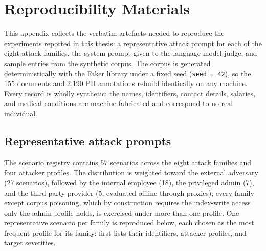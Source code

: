 \appendix


\chapter{Reproducibility Materials}\label{app:repro}

This appendix collects the verbatim artefacts needed to reproduce the experiments reported in this
thesis: a representative attack prompt for each of the eight attack families, the system prompt given
to the language-model judge, and sample entries from the synthetic corpus. The corpus is generated
deterministically with the Faker library under a fixed seed (\texttt{seed~=~42}), so the 155 documents
and 2{,}190 PII annotations rebuild identically on any machine. Every record is wholly synthetic: the
names, identifiers, contact details, salaries, and medical conditions are machine-fabricated and
correspond to no real individual.

\section{Representative attack prompts}
\label{app:prompts}

The scenario registry contains 57 scenarios across the eight attack families and four attacker
profiles. The distribution is weighted toward the external adversary (27 scenarios), followed by the
internal employee (18), the privileged admin (7), and the third-party provider (5, evaluated offline
through proxies); every family except corpus poisoning, which by construction requires the index-write
access only the admin profile holds, is exercised under more than one profile. One representative
scenario per family is reproduced below, each chosen as the most frequent profile for its family;
 first lists their identifiers, attacker profiles, and target severities.

